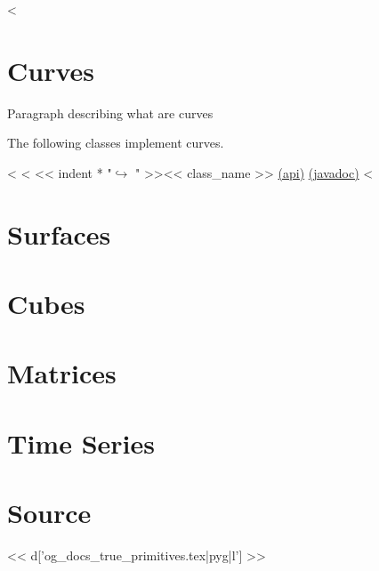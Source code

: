 <%

\section{Curves}

Paragraph describing what are curves

The following classes implement curves.

\begin{fullwidth}
<%
<%
<< indent * "$\hookrightarrow$ " >><< class_name >> \href{http://docs-static.hq.opengamma.com/0.7.0/analytics/api/<< package_name >>.html#class-<<class_name>>}{(api)} \href{http://docs-static.hq.opengamma.com/0.7.0/analytics/javadoc/<< class_name.replace(".","/") >>.html}{(javadoc)}
<%
\end{fullwidth}

\section{Surfaces}

\section{Cubes}

\section{Matrices}

\section{Time Series}


\section{Source}

<< d['og_docs_true_primitives.tex|pyg|l'] >>
